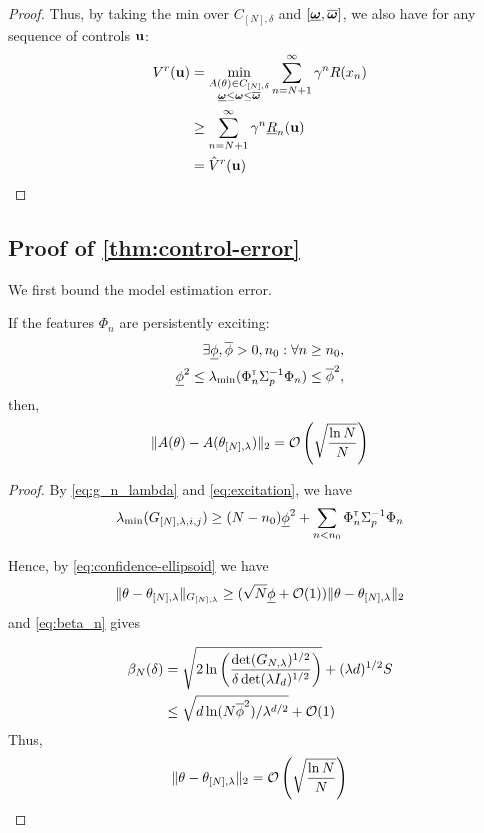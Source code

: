 \begin{subappendices}
\begin{proof}
		Thus, by taking the min over $C_{[N],\delta}$ and $[\underline{\bm{\omega}}, \overline{\bm{\omega}}]$, we also have for any sequence of controls $\mathbf{u}$:
		\begin{align*}
		V^r(\mathbf{u}) &= \min_{\substack{A(\theta)\in C_{[N],\delta}\\ \underline{\bm{\omega}} \leq \bm{\omega} \leq \overline{\bm{\omega}}}} \sum_{n=N+1}^\infty \gamma^n R(x_n)\\
		&\geq \sum_{n=N+1}^\infty \gamma^n \underline{R}_n(\mathbf{u})\\
		&= \hat{V}^r(\mathbf{u})
		\end{align*}
	\end{proof}
	
	\subsection{Proof of \autoref{thm:control-error}}
	
	We first bound the model estimation error.
	\begin{lemma}
		If the features $\Phi_n$ are persistently exciting:
		\begin{align}
		\label{eq:excitation}
		\exists \underline{\phi},\overline{\phi}>0, n_0: \forall n\geq n_0,\nonumber\\ \underline{\phi}^2 \leq \lambda_{\min}(\Phi_{n}^{\mathsf{\scriptscriptstyle T}}\Sigma_{p}^{-1}\Phi_{n}) \leq \overline{\phi}^2,
		\end{align}
		then,
		\[\|A(\theta) - A(\theta_{[N],\lambda})\|_2 = \mathcal{O}\left( \sqrt{\frac{\ln N}{N}} \right) \]
	\end{lemma}
	\begin{proof}
		By \eqref{eq:g_n_lambda} and \eqref{eq:excitation}, we have $$\lambda_{\min}(G_{[N],\lambda,i,j}) \geq (N-n_0)\underline{\phi}^2 + \sum_{n<n_0}\Phi_{n}^{\mathsf{\scriptscriptstyle T}}\Sigma_{p}^{-1}\Phi_{n}$$
		
		Hence, by \eqref{eq:confidence-ellipsoid} we have 
		\begin{align*}
		\|\theta - \theta_{[N],\lambda}\|_{G_{[N],\lambda}} \geq (\sqrt{N}\underline{\phi} + \mathcal{O}(1))\|\theta - \theta_{[N],\lambda}\|_{2}
		\end{align*}
		and \eqref{eq:beta_n} gives
		
		\begin{align*}
		\beta_N(\delta) &= \sqrt{2\ln \left(\frac{\det(G_{N,\lambda})^{1/2}}{\delta\det(\lambda I_d)^{1/2}}\right)}
		+ (\lambda d)^{1/2}S\\
		&\leq \sqrt{d\ln (N\overline{\phi}^2) / \lambda^{d/2}} + \mathcal{O}(1)
		\end{align*}
		Thus,
		\[\|\theta - \theta_{[N],\lambda}\|_{2} = \mathcal{O}\left( \sqrt{\frac{\ln N}{N}} \right) \]
		

\end{proof}
\end{subappendices}
